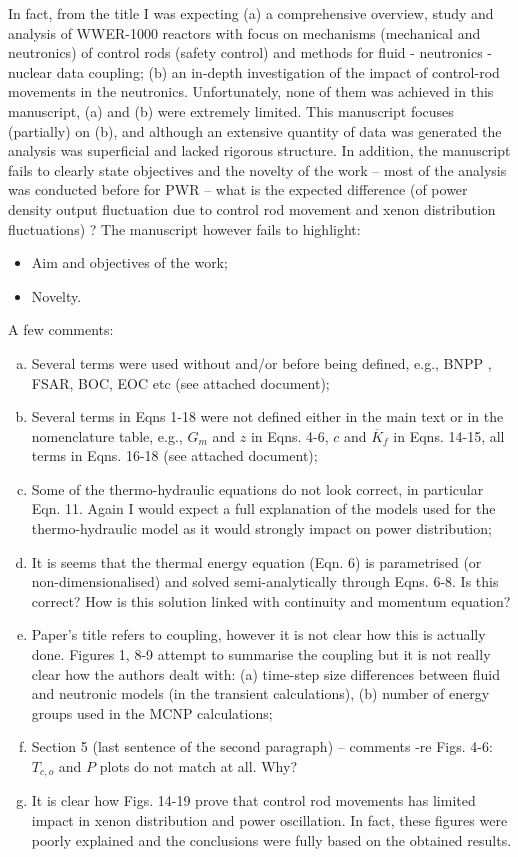 \documentclass[14pt,twoside]{report}
\begin{document}
In fact, from the title I was expecting (a) a comprehensive overview, study and analysis of WWER-1000 reactors with focus on mechanisms (mechanical and neutronics) of control rods (safety control) and methods for fluid - neutronics - nuclear data coupling; (b) an in-depth investigation of the impact of control-rod movements in the neutronics. Unfortunately, none of them was achieved in this manuscript, (a) and (b)  were extremely limited. This manuscript focuses (partially) on (b), and although an extensive quantity of data was generated the analysis was superficial and lacked rigorous structure. In addition, the manuscript fails to clearly state objectives and the novelty of the work -- most of the analysis was conducted before for PWR -- what is the expected difference (of power density output fluctuation due to control rod movement and xenon distribution fluctuations) ? The manuscript however fails to highlight:
  \begin{itemize}
    \item Aim and objectives of the work;
    \item Novelty.
  \end{itemize}
  A few comments:
\begin{enumerate}[(a)] 
%
    \item Several terms were used without and/or before being defined, e.g., BNPP , FSAR, BOC, EOC etc (see attached document);
    \item Several terms in Eqns 1-18 were not defined either in the main text or in the nomenclature table, e.g., $G_{m}$ and $z$ in Eqns. 4-6, $c$ and $\overline{K}_{f}$ in Eqns. 14-15, all terms in Eqns. 16-18 (see attached document);
    \item Some of the thermo-hydraulic equations do not look correct, in particular Eqn. 11. Again I would expect a full explanation of the models used for the thermo-hydraulic model as it would strongly impact on power distribution;
    \item It is seems that the thermal energy equation (Eqn. 6) is parametrised (or non-dimensionalised) and solved semi-analytically through Eqns. 6-8. Is this correct? How is this solution linked with continuity and momentum equation?
    \item Paper's title refers to coupling, however it is not clear how this is actually done. Figures 1, 8-9 attempt to summarise the coupling but it is not really clear how the authors dealt with: (a) time-step size differences between fluid and neutronic models (in the transient calculations), (b) number of energy groups used in the MCNP calculations;
    \item Section 5 (last sentence of the second paragraph) -- comments -re Figs. 4-6: $T_{c,o}$ and $P$ plots do not match at all. Why?
      \item It is clear how Figs. 14-19 prove that control rod movements has limited impact in xenon distribution and power oscillation. In fact, these figures were poorly explained and the conclusions were fully based on the obtained results. 
\end{enumerate}
\end{document}
